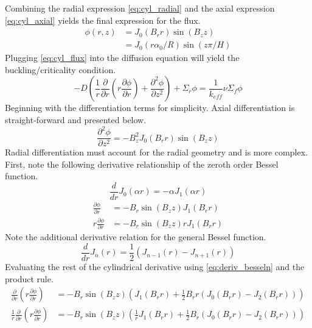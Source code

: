   Combining the radial expression \eqref{eq:cyl_radial} and the axial 
  expression \eqref{eq:cyl_axial} yields the final expression for the flux.
  \begin{align} \label{eq:cyl_flux}
    \phi(r,z) &= J_0(B_r r) \sin(B_z z) \\
    &= J_0(r \alpha_0 / R) \sin(z \pi / H)
  \end{align}
  Plugging \eqref{eq:cyl_flux} into the diffusion equation will yield the 
  buckling/criticality condition.
  \begin{equation}
    -D \left( \frac{1}{r} \frac{\partial}{\partial r} \left( r 
      \frac{\partial \phi}{\partial r} \right) + \frac{\partial^2 \phi}
      {\partial z^2} \right) + \Sigma_r \phi = \frac{1}{k_{eff}} \nu 
      \Sigma_f \phi
  \end{equation}
  Beginning with the differentiation terms for simplicity. Axial 
  differentiation is straight-forward and presented below.
  \begin{equation}
    \frac{\partial^2 \phi}{\partial z^2} = -B_z^2 J_0(B_r r) \sin(B_z z)
  \end{equation}
  Radial differentiation must account for the radial geometry and is more 
  complex. First, note the following derivative relationship of the zeroth
  order Bessel function.
  \begin{equation} \label{eq:deriv_bessel0}
    \frac{d}{dr} J_0(\alpha r) = - \alpha J_1(\alpha r)
  \end{equation}
  \begin{align}
    \frac{\partial \phi}{\partial r} &= -B_r \sin(B_z z) J_1(B_r r) \\
    r \frac{\partial \phi}{\partial r} &= -B_r \sin(B_z z) r J_1 (B_r r) 
  \end{align}
  Note the additional derivative relation for the general Bessel function.
  \begin{equation} \label{eq:deriv_besseln}
    \frac{d}{dr} J_n(r) = \frac{1}{2} \left( J_{n-1}(r) - J_{n+1}(r)\right)
  \end{equation}
  Evaluating the rest of the cylindrical derivative using
  \eqref{eq:deriv_besseln} and the product rule.
  \begin{align}
    \frac{\partial}{\partial r} \left( r \frac{\partial \phi}{\partial r}
      \right) &= -B_r \sin(B_z z) \left(J_1(B_r r) + \frac{1}{2} B_r r \left(
      J_0(B_r r) - J_2(B_r r) \right) \right) \\
    \frac{1}{r} \frac{\partial}{\partial r} \left(r 
      \frac{\partial \phi}{\partial r} \right) &=
      -B_r \sin(B_z z) \left(\frac{1}{r} J_1(B_r r) + \frac{1}{2} B_r \left(
      J_0(B_r r) - J_2(B_r r) \right) \right)
  \end{align}
